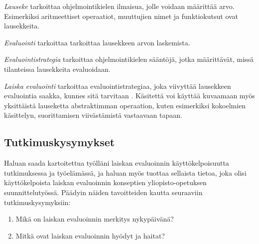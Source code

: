 \textit{Lauseke} tarkoittaa ohjelmointikielen ilmaisua, jolle voidaan määrittää arvo. Esimerkiksi aritmeettiset operaatiot, muuttujien nimet ja funktiokutsut ovat lausekkeita.

\textit{Evaluointi} tarkoittaa tarkoittaa lausekkeen arvon laskemista.

\textit{Evaluointistrategia} tarkoittaa ohjelmointikielen sääntöjä, jotka määrittävät, missä tilanteissa lausekkeita evaluoidaan.

\textit{Laiska evaluointi} tarkoittaa evaluointistrategiaa, joka viivyttää lausekkeen evaluointia saakka, kunnes sitä tarvitaan \citep{watt2004programming}. Käsitettä voi käyttää kuvaamaan myös yksittäistä lauseketta abstraktimman operaation, kuten esimerkiksi kokoelmien käsittelyn, suorittamisen viivästämistä vastaavaan tapaan.



\subsection{Tutkimuskysymykset}

Haluan saada kartoitettua työlläni laiskan evaluoinnin käyttökelpoisuutta tutkimuksessa ja työelämässä, ja haluan myös tuottaa sellaista tietoa, joka olisi käyttökelpoista laiskan evaluoinnin konseptien yliopisto-opetuksen suunnittelutyössä. Päädyin näiden tavoitteiden kautta seuraaviin tutkimuskysymyksiin:
\begin{enumerate}
  \item{Mikä on laiskan evaluoinnin merkitys nykypäivänä?}
  \item{Mitkä ovat laiskan evaluoinnin hyödyt ja haitat?}
\end{enumerate}

